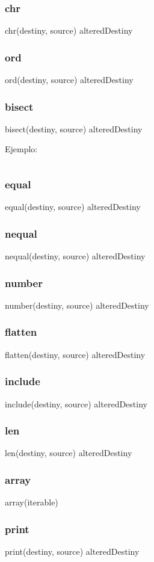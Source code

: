 \subsubsection*{chr}
chr(destiny, source) \rightarrow alteredDestiny
\subsubsection*{ord}
ord(destiny, source) \rightarrow alteredDestiny
\subsubsection*{bisect}
bisect(destiny, source) \rightarrow alteredDestiny

\noindent
Ejemplo:
\begin{lstlisting}[style=consola]
\end{lstlisting}

\subsubsection*{equal}
equal(destiny, source) \rightarrow alteredDestiny
\subsubsection*{nequal}
nequal(destiny, source) \rightarrow alteredDestiny
\subsubsection*{number}
number(destiny, source) \rightarrow alteredDestiny
\subsubsection*{flatten}
flatten(destiny, source) \rightarrow alteredDestiny
\subsubsection*{include}
include(destiny, source) \rightarrow alteredDestiny
\subsubsection*{len}
len(destiny, source) \rightarrow alteredDestiny
\subsubsection*{array}
array(iterable) \rightarrow [element...]
\subsubsection*{print}
print(destiny, source) \rightarrow alteredDestiny
